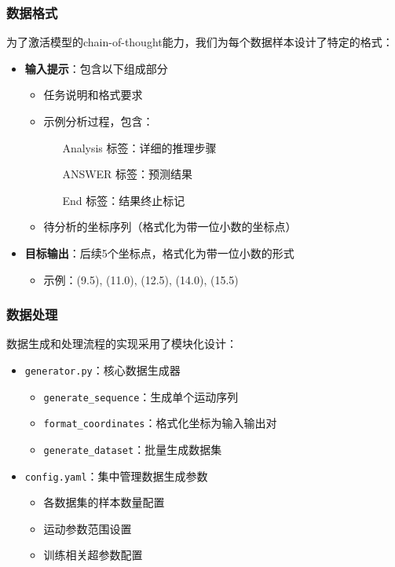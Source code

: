 \documentclass[a4paper, 12pt]{article}
\begin{document}
\subsubsection{数据格式}
为了激活模型的chain-of-thought能力，我们为每个数据样本设计了特定的格式：

\begin{itemize}
    \item \textbf{输入提示}：包含以下组成部分
        \begin{itemize}
            \item 任务说明和格式要求
            \item 示例分析过程，包含：
                \begin{itemize}
                    \item [Analysis]标签：详细的推理步骤
                    \item [ANSWER]标签：预测结果
                    \item [End]标签：结果终止标记
                \end{itemize}
            \item 待分析的坐标序列（格式化为带一位小数的坐标点）
        \end{itemize}
    
    \item \textbf{目标输出}：后续5个坐标点，格式化为带一位小数的形式
        \begin{itemize}
            \item 示例：(9.5), (11.0), (12.5), (14.0), (15.5)
        \end{itemize}
\end{itemize}

\subsubsection{数据处理}
数据生成和处理流程的实现采用了模块化设计：

\begin{itemize}
    \item \texttt{generator.py}：核心数据生成器
        \begin{itemize}
            \item \texttt{generate\_sequence}：生成单个运动序列
            \item \texttt{format\_coordinates}：格式化坐标为输入输出对
            \item \texttt{generate\_dataset}：批量生成数据集
        \end{itemize}
    \item \texttt{config.yaml}：集中管理数据生成参数
        \begin{itemize}
            \item 各数据集的样本数量配置
            \item 运动参数范围设置
            \item 训练相关超参数配置
        \end{itemize}
\end{itemize}
\end{document}
